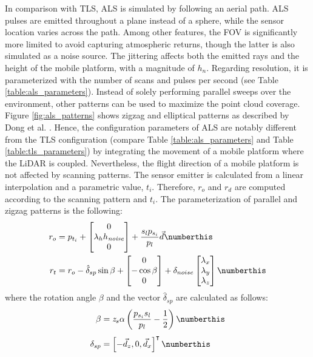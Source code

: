 In comparison with TLS, ALS is simulated by following an aerial path. ALS pulses are emitted throughout a plane instead of a sphere, while the sensor location varies across the path. Among other features, the FOV is significantly more limited to avoid capturing atmospheric returns, though the latter is also simulated as a noise source. The jittering affects both the emitted rays and the height of the mobile platform, with a magnitude of $h_n$. Regarding resolution, it is parameterized with the number of scans and pulses per second (see Table \ref{table:als_parameters}). Instead of solely performing parallel sweeps over the environment, other patterns can be used to maximize the point cloud coverage. Figure \ref{fig:als_patterns} shows zigzag and elliptical patterns as described by Dong et al. \cite{dong_lidar_2018}. Hence, the configuration parameters of ALS are notably different from the TLS configuration (compare Table \ref{table:als_parameters} and Table \ref{table:tls_parameters}) by integrating the movement of a mobile platform where the LiDAR is coupled. Nevertheless, the flight direction of a mobile platform is not affected by scanning patterns. The sensor emitter is calculated from a linear interpolation and a parametric value, $t_i$. Therefore, $r_o$ and $r_d$ are computed according to the scanning pattern and $t_i$. The parameterization of parallel and zigzag patterns is the following:
\begin{align*}
    r_{o} &= p_{t_{i}} + 
    \begin{bmatrix} 0 \\ \lambda_{h}h_{\textit{noise}} \\ 0 \end{bmatrix} + \frac{s_{l}p_{s_{i}}}{p_{l}} \vec{d}
    \numberthis \label{eq:ray_origin_als_zigzag}\\
    r_{t} &= r_{o} - \hat{\delta}_{sp} \sin{\beta} +
    \begin{bmatrix}0 \\ -\cos{\beta}\\ 0 \end{bmatrix} + \delta_{noise}
    \begin{bmatrix}\lambda_{x} \\ \lambda_{y}\\ \lambda_{z} \end{bmatrix}
    \numberthis \label{eq:ray_target_als_zigzag}
\end{align*}
where the rotation angle $\beta$ and the vector $\hat{\delta}_{sp}$ are calculated as follows:
\begin{align*}
    \beta &= \textit{z}_{s}\alpha \left(\frac{p_{s_{i}} s_{l}}{p_{l}} - \frac{1}{2}\right)
    \numberthis \label{eq:beta_als_zigzag}\\[0.4em]
    \delta_{sp} &= \left[-\vec{d}_{z}, 0, \vec{d}_{x}\right]^\intercal
    \numberthis \label{eq:rotation_axis_als_zigzag}
\end{align*}
